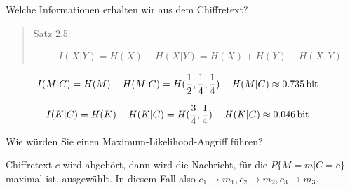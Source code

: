   Welche Informationen erhalten wir aus dem Chiffretext?

  \begin{quote}
    Satz 2.5:

    \begin{align*}
      & I(X | Y) = H(X) - H(X | Y) = H(X) + H(Y) - H(X, Y)
    \end{align*}
  \end{quote}

  \begin{align*}
    & I(M | C) = H(M) - H(M | C) = H(\frac{1}{2}, \frac{1}{4}, \frac{1}{4}) - H(M | C) \approx \SI{0,735}{\bit}
  \end{align*}

  \begin{align*}
    & I(K | C) = H(K) - H(K | C) = H(\frac{3}{4}, \frac{1}{4}) - H(K | C) \approx \SI{0,046}{\bit}
  \end{align*}

  Wie würden Sie einen Maximum-Likelihood-Angriff führen?

  Chiffretext $c$ wird abgehört, dann wird die Nachricht, für die $P\{M = m | C = c\}$ maximal ist, ausgewählt. In diesem Fall also $c_1 \rightarrow m_1, c_2 \rightarrow m_2, c_3 \rightarrow m_3$.

